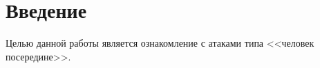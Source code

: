 \section*{Введение}

Целью данной работы является ознакомление с атаками типа <<человек посередине>>.

